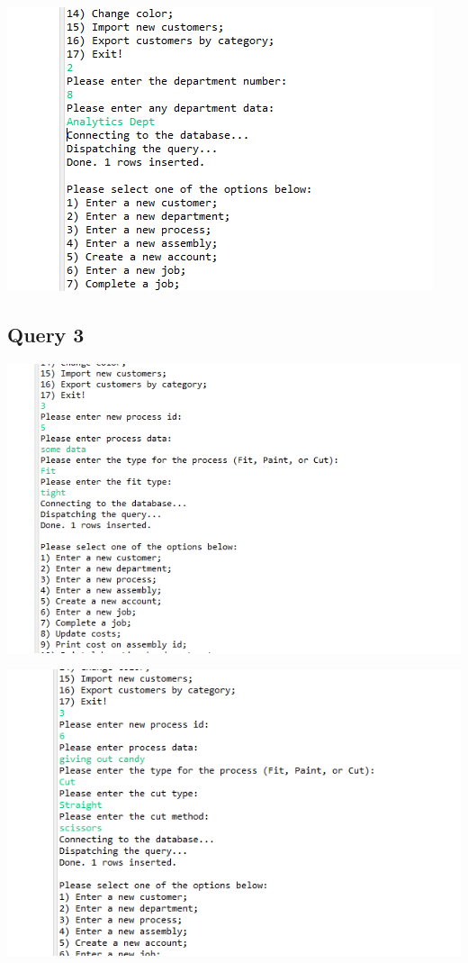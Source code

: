 \documentclass[11pt]{article}
\begin{document}
\includegraphics[width = \textwidth]{dept5.png}

\subsection{Query 3}
\includegraphics[width = \textwidth]{process1.png}

\includegraphics[width = \textwidth]{process2.png}
\end{document}
